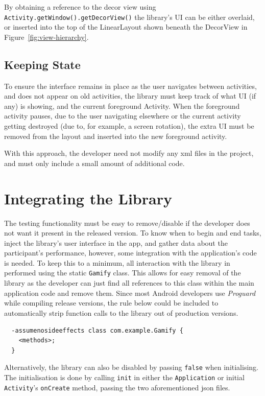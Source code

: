 By obtaining a reference to the decor view using 
\verb/Activity.getWindow().getDecorView()/ the library's UI can
be either overlaid, or inserted into the top of the LinearLayout
shown beneath the DecorView in Figure~\ref{fig:view-hierarchy}.

\subsection{Keeping State}

To ensure the interface remains in place as the user navigates
between activities, and does not appear on old activities, the
library must keep track of what UI (if any) is showing, and 
the current foreground Activity. When the foreground activity
pauses, due to the user navigating elsewhere or the current
activity getting destroyed (due to, for example, a screen
rotation), the extra UI must be removed from the layout and 
inserted into the new foreground activity.

With this approach, the developer need not modify any xml files
in the project, and must only include a small amount of additional
code.

\section{Integrating the Library}

The testing functionality must be easy to remove/disable if the
developer does not want it present in the released version. To know
when to begin and end tasks, inject the library's user interface
in the app, and gather data about the participant's performance,
however, some integration with the application's code is needed.
To keep this to a minimum, all interaction with the library in
performed using the static \verb/Gamify/ class. This allows for
easy removal of the library as the developer can just find all
references to this class within the main application code and remove
them. Since most Android developers use \emph{Proguard} while
compiling release versions, the rule below could be included to
automatically strip function calls to the library out of production
versions.

\begin{verbatim}
  -assumenosideeffects class com.example.Gamify {
    <methods>;
  }
\end{verbatim}

Alternatively, the library can also be disabled by passing \verb|false|
when initialising. The initialisation is done by calling \verb|init|
in either the \verb|Application| or initial \verb|Activity|'s
\verb|onCreate| method, passing the two aforementioned json files.

